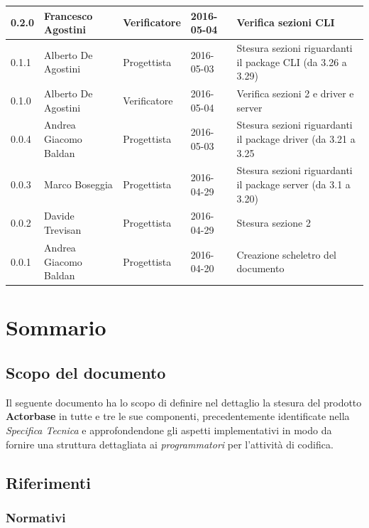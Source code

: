 \documentclass{scalatekids-article}
\begin{document}
\begin{center}
\begin{longtable}{| l | l | l | l | p{5cm} |}
    \hline
    0.2.0 & Francesco Agostini & Verificatore & 2016-05-04 & Verifica sezioni CLI\\
    \hline
    0.1.1 & Alberto De Agostini & Progettista & 2016-05-03 & Stesura sezioni riguardanti il package CLI (da 3.26 a 3.29)\\
    \hline
    0.1.0 & Alberto De Agostini & Verificatore & 2016-05-04 & Verifica sezioni 2 e driver e server\\
    \hline
    0.0.4 & Andrea Giacomo Baldan & Progettista & 2016-05-03 & Stesura sezioni riguardanti il package driver (da 3.21 a 3.25\\
    \hline
    0.0.3 & Marco Boseggia & Progettista & 2016-04-29 & Stesura sezioni riguardanti il package server (da 3.1 a 3.20)\\
    \hline
    0.0.2 & Davide Trevisan & Progettista & 2016-04-29 & Stesura sezione 2\\
    \hline
    0.0.1 & Andrea Giacomo Baldan & Progettista & 2016-04-20 & Creazione scheletro del documento\\
    \hline
  \end{longtable}
\end{center}
\newpage
\tableofcontents
\newpage
{}

\section{Sommario}

\subsection{Scopo del documento}

Il seguente documento ha lo scopo di definire nel dettaglio la stesura del
prodotto \textbf{Actorbase} in tutte e tre le sue componenti, precedentemente
identificate nella \textit{Specifica Tecnica} e approfondendone gli aspetti
implementativi in modo da fornire una struttura dettagliata ai
\textit{programmatori} per l'attività di codifica.

\prodPurpose

\glossExpl

\subsection{Riferimenti}

\subsubsection{Normativi}
\end{document}
